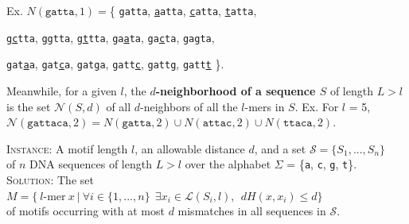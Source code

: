 \documentclass[oneside,12pt]{DISCSthesis}
\begin{document}
		\noindent\begin{minipage}{\textwidth} {
				\noindent\hspace*{35pt} Ex. $N(\texttt{gatta}, 1) =$\{ \texttt{gatta},
					\texttt{\ul{a}atta}, \texttt{\ul{c}atta}, \texttt{\ul{t}atta},				
					
					\hspace*{150pt}\texttt{g\ul{c}tta}, \texttt{g\ul{g}tta}, \texttt{g\ul{t}tta},
					\texttt{ga\ul{a}ta}, \texttt{ga\ul{c}ta}, \texttt{ga\ul{g}ta},

				 	\hspace*{150pt}\texttt{gat\ul{a}a}, \texttt{gat\ul{c}a}, \texttt{gat\ul{g}a},
				 	\texttt{gatt\ul{c}}, \texttt{gatt\ul{g}}, \texttt{gatt\ul{t}} \}.

		}\end{minipage}\newline

		\noindent Meanwhile, for a given $l$, the \textbf{\boldmath $d$-neighborhood of a sequence $S$} of length $L > l$ is the set {\boldmath $\mathcal{N}(S, d)$} of all $d$-neighbors of all the $l$-mers in $S$.
		\newline\hspace*{35pt} Ex. For $l$ = 5,
			$\mathcal{N}(\texttt{gattaca}, 2) 
					= N(\texttt{gatta}, 2) \cup 
						N(\texttt{attac}, 2) \cup
						N(\texttt{ttaca}, 2)$.\newline
		
		\newline
		\noindent \textsc{Instance:} A motif length $l$, an allowable distance $d$, and a set $\mathcal{S} = \{S_{1},..., S_{n}\}$\\
		\noindent\hspace*{55pt}of $n$ DNA sequences of length $L > l$ over the alphabet $\Sigma$ = \{\texttt{a}, \texttt{c}, \texttt{g}, \texttt{t}\}.\newline
		\noindent \textsc{Solution:} The set $M = \{\ l\text{-mer}\ x\ |\ \forall i \in \{1,...,n\}\ \ \exists x_i \in \mathcal{L}(S_i,l),\ \ dH(x, x_i) \leq d \}$\\
		\noindent\hspace*{55pt}of motifs occurring with at most $d$ mismatches in all sequences in $\mathcal{S}$.
		\newpage
\end{document}
